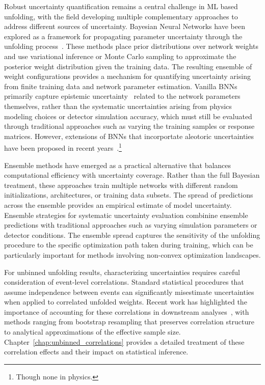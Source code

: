     Robust uncertainty quantification remains a central challenge in ML based unfolding, with the field developing multiple complementary approaches to address different sources of uncertainty.
    Bayesian Neural Networks have been explored as a framework for propagating parameter uncertainty through the unfolding process~\cite{brehmer_guide_2018,Feindt:2004wla,Zhong:2011xm,perryBayesianNeuralNetworks2014,Chua:2019wwt,izmailovWhatAreBayesian2021,hronWideBayesianNeural2022,wenzelHowGoodBayes2020,Huetsch:2024quz,bonnevilleBayesianDeepLearning2022}.
    These methods place prior distributions over network weights and use variational inference or Monte Carlo sampling to approximate the posterior weight distribution given the training data.
    The resulting ensemble of weight configurations provides a mechanism for quantifying uncertainty arising from finite training data and network parameter estimation.
    Vanilla BNNs primarily capture epistemic uncertainty~\cite{mehraUncertaintyQuantificationDeep2021} related to the network parameters themselves, rather than the systematic uncertainties arising from physics modeling choices or detector simulation accuracy, which must still be evaluated through traditional approaches such as varying the training samples or response matrices.
    However, extensions of BNNs that incorportate aleotoric uncertainties have been proposed in recent years~\cite{munikotiGeneralFrameworkQuantifying2023,Kendall:2017tnb,depewegDecompositionUncertaintyBayesian2018}.\footnote{Though none in physics.}


    Ensemble methods have emerged as a practical alternative that balances computational efficiency with uncertainty coverage.
    Rather than the full Bayesian treatment, these approaches train multiple networks with different random initializations, architectures, or training data subsets.
    The spread of predictions across the ensemble provides an empirical estimate of model uncertainty.
    Ensemble strategies for systematic uncertainty evaluation combinine ensemble predictions with traditional approaches such as varying simulation parameters or detector conditions.
    The ensemble spread captures the sensitivity of the unfolding procedure to the specific optimization path taken during training, which can be particularly important for methods involving non-convex optimization landscapes.

    For unbinned unfolding results, characterizing uncertainties requires careful consideration of event-level correlations.
    Standard statistical procedures that assume independence between events can significantly misestimate uncertainties when applied to correlated unfolded weights.
    Recent work has highlighted the importance of accounting for these correlations in downstream analyses~\cite{Desai:2025mpy}, with methods ranging from bootstrap resampling that preserves correlation structure to analytical approximations of the effective sample size.
    Chapter~\ref{chap:unbinned_correlations} provides a detailed treatment of these correlation effects and their impact on statistical inference.

